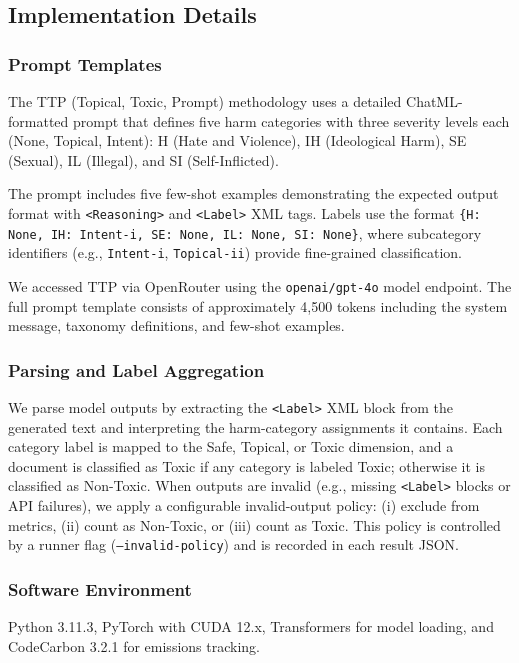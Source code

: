 \documentclass[10pt]{article} %
\begin{document}
\subsection{Implementation Details}
\label{sec:appendix-impl}
\subsubsection{Prompt Templates}
\label{sec:prompt-templates}

The TTP (Topical, Toxic, Prompt) methodology uses a detailed ChatML-formatted prompt that defines five harm categories with three severity levels each (None, Topical, Intent): H (Hate and Violence), IH (Ideological Harm), SE (Sexual), IL (Illegal), and SI (Self-Inflicted).

The prompt includes five few-shot examples demonstrating the expected output format with \texttt{<Reasoning>} and \texttt{<Label>} XML tags. Labels use the format \texttt{\{H: None, IH: Intent-i, SE: None, IL: None, SI: None\}}, where subcategory identifiers (e.g., \texttt{Intent-i}, \texttt{Topical-ii}) provide fine-grained classification.

We accessed TTP via OpenRouter using the \texttt{openai/gpt-4o} model endpoint. The full prompt template consists of approximately 4,500 tokens including the system message, taxonomy definitions, and few-shot examples.

\subsubsection{Parsing and Label Aggregation}
\label{sec:parsing}
We parse model outputs by extracting the \texttt{<Label>} XML block from the generated text and interpreting the harm-category assignments it contains. Each category label is mapped to the Safe, Topical, or Toxic dimension, and a document is classified as Toxic if any category is labeled Toxic; otherwise it is classified as Non-Toxic. When outputs are invalid (e.g., missing \texttt{<Label>} blocks or API failures), we apply a configurable invalid-output policy: (i) exclude from metrics, (ii) count as Non-Toxic, or (iii) count as Toxic. This policy is controlled by a runner flag (\texttt{--invalid-policy}) and is recorded in each result JSON.

\subsubsection{Software Environment}
\label{sec:software}

Python 3.11.3, PyTorch with CUDA 12.x, Transformers for model loading, and CodeCarbon 3.2.1 for emissions tracking.
\end{document}
